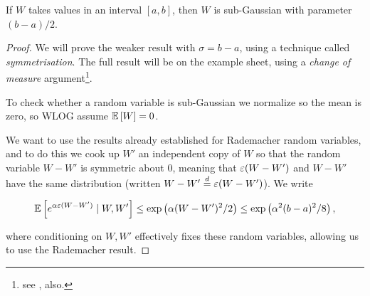\documentclass[11pt]{scrartcl}
\begin{document}
\begin{theorem}
If $W$ takes values in an interval $[a,b]$, then $W$ is sub-Gaussian with parameter $(b-a)/2$.

\begin{proof}
We will prove the weaker result with $\sigma = b-a$, using a technique called \emph{symmetrisation}. The full result will be on the example sheet, using a \emph{change of measure} argument\footnote{see \cite{MIT Notes}, also.}.

To check whether a random variable is sub-Gaussian we normalize so the mean is zero, so WLOG assume $\mathbb{E} \left[ W \right]=0$.

We want to use the results already established for Rademacher random variables, and to do this we cook up $W'$ an independent copy of $W$ so that the random variable $W-W'$ is symmetric about 0, meaning that $\varepsilon (W - W')$ and $W - W'$ have the same distribution (written $W - W' \stackrel{d}{=} \varepsilon(W - W')$). We write %

\begin{equation}
    \mathbb{E} \left[ e^{\alpha \varepsilon (W-W')} \mid W, W' \right] \le \text{exp} \left( \alpha (W-W')^2 / 2 \right) \le \text{exp} \left( \alpha^2 (b-a)^2 / 8 \right),
\label{L3 ideal Hoeffding}
\end{equation}

where conditioning on $W, W'$ effectively fixes these random variables, allowing us to use the Rademacher result.








\end{proof}
\end{theorem}
\end{document}
